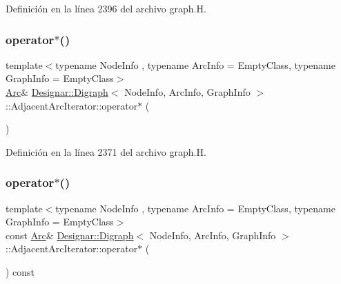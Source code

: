 Definición en la línea 2396 del archivo graph.\+H.

\mbox{\label{class_designar_1_1_digraph_1_1_adjacent_arc_iterator_a2a1ee85a8076e07fd99d35676ec69887}} 
\subsubsection{\texorpdfstring{operator$\ast$()}{operator*()}\hspace{0.1cm}{\footnotesize\ttfamily [1/2]}}
{\footnotesize\ttfamily template$<$typename Node\+Info , typename Arc\+Info  = Empty\+Class, typename Graph\+Info  = Empty\+Class$>$ \\
\hyperlink{class_designar_1_1_digraph_a0ceb278671f2a535c00fddccdeafd69f}{Arc}\& \hyperlink{class_designar_1_1_digraph}{Designar\+::\+Digraph}$<$ Node\+Info, Arc\+Info, Graph\+Info $>$\+::Adjacent\+Arc\+Iterator\+::operator$\ast$ (\begin{DoxyParamCaption}{ }\end{DoxyParamCaption})\hspace{0.3cm}{\ttfamily [inline]}}



Definición en la línea 2371 del archivo graph.\+H.

\mbox{\label{class_designar_1_1_digraph_1_1_adjacent_arc_iterator_aaf54c97702c3b6e3ccf419c2f7966e44}} 
\subsubsection{\texorpdfstring{operator$\ast$()}{operator*()}\hspace{0.1cm}{\footnotesize\ttfamily [2/2]}}
{\footnotesize\ttfamily template$<$typename Node\+Info , typename Arc\+Info  = Empty\+Class, typename Graph\+Info  = Empty\+Class$>$ \\
const \hyperlink{class_designar_1_1_digraph_a0ceb278671f2a535c00fddccdeafd69f}{Arc}\& \hyperlink{class_designar_1_1_digraph}{Designar\+::\+Digraph}$<$ Node\+Info, Arc\+Info, Graph\+Info $>$\+::Adjacent\+Arc\+Iterator\+::operator$\ast$ (\begin{DoxyParamCaption}{ }\end{DoxyParamCaption}) const\hspace{0.3cm}{\ttfamily [inline]}}



